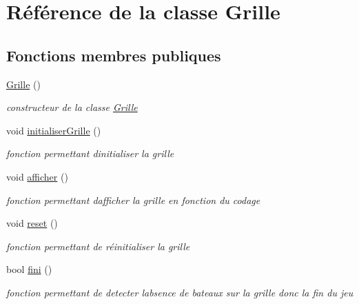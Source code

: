 \hypertarget{class_grille}{}\section{Référence de la classe Grille}
\label{class_grille}
\subsection*{Fonctions membres publiques}
\begin{DoxyCompactItemize}
\item 
\mbox{\label{class_grille_a8a15d40f4706c34fb2f75d9289f9f615}} 
\mbox{\hyperlink{class_grille_a8a15d40f4706c34fb2f75d9289f9f615}{Grille}} ()
\begin{DoxyCompactList}\small\item\em constructeur de la classe \mbox{\hyperlink{class_grille}{Grille}} \end{DoxyCompactList}\item 
\mbox{\label{class_grille_ab7bdedc97b08bfb40ed00d7e995d7e44}} 
void \mbox{\hyperlink{class_grille_ab7bdedc97b08bfb40ed00d7e995d7e44}{initialiser\+Grille}} ()
\begin{DoxyCompactList}\small\item\em fonction permettant d\textquotesingle{}initialiser la grille \end{DoxyCompactList}\item 
\mbox{\label{class_grille_a22474eed2d2c31ec1cb53e44095eed69}} 
void \mbox{\hyperlink{class_grille_a22474eed2d2c31ec1cb53e44095eed69}{afficher}} ()
\begin{DoxyCompactList}\small\item\em fonction permettant d\textquotesingle{}afficher la grille en fonction du codage \end{DoxyCompactList}\item 
\mbox{\label{class_grille_a17d8b9233b4d7fe24fe5e0c4809674e7}} 
void \mbox{\hyperlink{class_grille_a17d8b9233b4d7fe24fe5e0c4809674e7}{reset}} ()
\begin{DoxyCompactList}\small\item\em fonction permettant de réinitialiser la grille \end{DoxyCompactList}\item 
\mbox{\label{class_grille_af22b526602ad163f6e6f7f7c8f486aa2}} 
bool \mbox{\hyperlink{class_grille_af22b526602ad163f6e6f7f7c8f486aa2}{fini}} ()
\begin{DoxyCompactList}\small\item\em fonction permettant de detecter l\textquotesingle{}absence de bateaux sur la grille donc la fin du jeu \end{DoxyCompactList}\end{DoxyCompactItemize}
